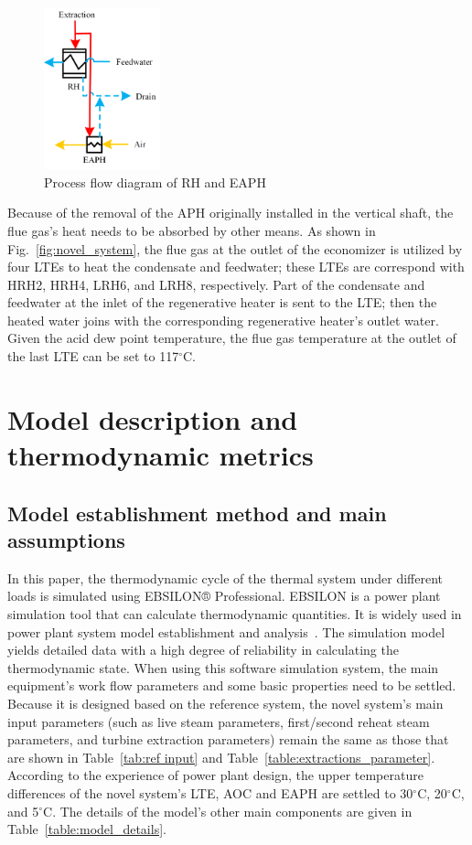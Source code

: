 \documentclass[preprint,12pt]{elsarticle}
\begin{document}
\begin{figure}[htbp]
\centering
\includegraphics[width=0.3\textwidth]{fig/extracion_heat_APH.png}
\caption{Process flow diagram of RH and EAPH} 
\label{fig:extraction_heat_APH}
\end{figure}

Because of the removal of the APH originally installed in the vertical shaft, the flue gas's heat needs to be absorbed by other means.
As shown in Fig.~\ref{fig:novel_system}, the flue gas at the outlet of the economizer is utilized by four LTEs to heat the condensate and feedwater; these LTEs are correspond with HRH2, HRH4, LRH6, and LRH8, respectively. 
Part of the condensate and feedwater at the inlet of the regenerative heater is sent to the LTE; then the heated water joins with the corresponding regenerative heater's outlet water. 
Given the acid dew point temperature, the flue gas temperature at the outlet of the last LTE can be set to 117$^\circ$C. 

\section{Model description and thermodynamic metrics}
\label{ssub:model_establishment_and_system_analysis_method}

\subsection{Model establishment method and main assumptions}
\label{ssub3:modle description}

In this paper, the thermodynamic cycle of the thermal system under different loads is simulated using EBSILON® Professional.
EBSILON is a power plant simulation tool that can calculate thermodynamic quantities. It is widely used in power plant system model establishment and analysis~\cite{Li2015Integrated,Yao2017Multi}. 
The simulation model yields detailed data with a high degree of reliability in calculating the thermodynamic state.
When using this software simulation system, the main equipment's work flow parameters and some basic properties need to be settled.
Because it is designed based on the reference system, the novel system's main input parameters (such as live steam parameters, first/second reheat steam parameters, and turbine extraction parameters) remain the same as those that are shown in Table~\ref{tab:ref input} and Table~\ref{table:extractions_parameter}.
According to the experience of power plant design, the upper temperature differences of the novel system's LTE, AOC and EAPH are settled to 30$^\circ$C, 20$^\circ$C, and 5$^\circ$C. 
The details of the model's other main components are given in Table~\ref{table:model_details}. 
\end{document}
